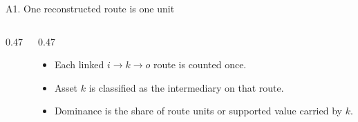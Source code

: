 \begin{frame}{A1. One reconstructed route is one unit}
\begin{columns}[T]
\begin{column}{0.47\textwidth}
\centering
{}
\end{column}
\begin{column}{0.47\textwidth}
\begin{itemize}
\item Each linked $i\rightarrow k\rightarrow o$ route is counted once.
\item Asset $k$ is classified as the intermediary on that route.
\item Dominance is the share of route units or supported value carried by $k$.
\end{itemize}
\end{column}
\end{columns}
\end{frame}

